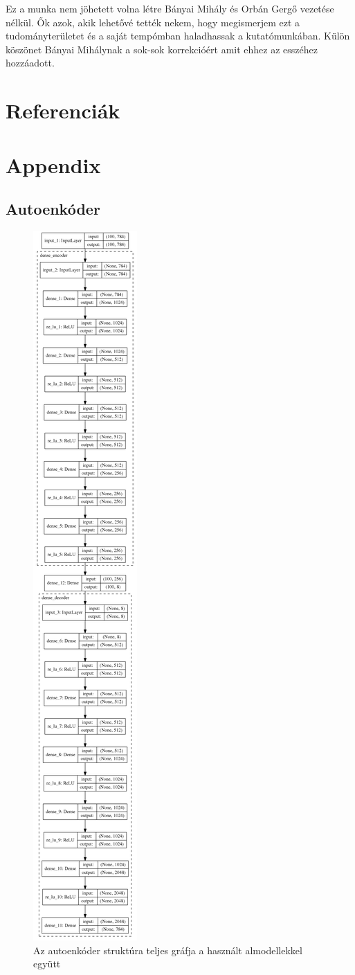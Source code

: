 \documentclass[12pt, english]{article}
\begin{document}
\par Ez a munka nem jöhetett volna létre Bányai Mihály és Orbán Gergő vezetése nélkül. Ők azok, akik lehetővé tették nekem, hogy megismerjem ezt a tudományterületet és a saját tempómban haladhassak a kutatómunkában. Külön köszönet Bányai Mihálynak a sok-sok korrekcióért amit ehhez az esszéhez hozzáadott. 

\newpage

\section*{Referenciák}
\label{sec:references}
\printbibliography[heading=none]

\appendix
\section*{Appendix}
\label{sec:appendix}

\subsection*{Autoenkóder}
\label{sec:auto-encoder}

\begin{figure}[H]
    \centering
    \includegraphics[width=0.12\linewidth]{DenseAutoEncoder_vertical.png} 
    \caption{Az autoenkóder struktúra teljes gráfja a használt almodellekkel együtt} 
    \label{fig:suru-auto-encoder}
\end{figure}
\end{document}
